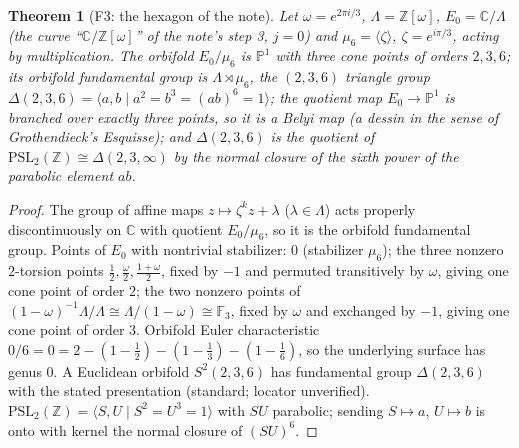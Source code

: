 \documentclass[11pt]{article}
\newtheorem{theorem}{Theorem}\newtheorem{lemma}[theorem]{Lemma}\newtheorem{corollary}[theorem]{Corollary}
\theoremstyle{definition}\newtheorem{definition}[theorem]{Definition}\newtheorem{remark}[theorem]{Remark}
\begin{document}
\begin{theorem}[F3: the hexagon of the note]\label{F3} Let $\omega=e^{2\pi i/3}$, $\Lambda=\mathbb Z[\omega]$, $E_0=\mathbb C/\Lambda$
(the curve ``$\mathbb C/\mathbb Z[\omega]$'' of the note's step 3, $j=0$) and $\mu_6=\langle\zeta\rangle$, $\zeta=e^{i\pi/3}$, acting by
multiplication. The orbifold $E_0/\mu_6$ is $\mathbb P^1$ with three cone points of orders $2,3,6$; its orbifold fundamental
group is $\Lambda\rtimes\mu_6$, the $(2,3,6)$ triangle group $\Delta(2,3,6)=\langle a,b\mid a^2=b^3=(ab)^6=1\rangle$; the
quotient map $E_0\to\mathbb P^1$ is branched over exactly three points, so it is a Belyi map (a dessin in the sense of
Grothendieck's \emph{Esquisse}); and $\Delta(2,3,6)$ is the quotient of $\mathrm{PSL}_2(\mathbb Z)\cong\Delta(2,3,\infty)$ by
the normal closure of the sixth power of the parabolic element $ab$.\end{theorem}
\begin{proof} The group of affine maps $z\mapsto\zeta^kz+\lambda$ ($\lambda\in\Lambda$) acts properly discontinuously on
$\mathbb C$ with quotient $E_0/\mu_6$, so it is the orbifold fundamental group. Points of $E_0$ with nontrivial stabilizer:
$0$ (stabilizer $\mu_6$); the three nonzero $2$-torsion points $\tfrac12,\tfrac\omega2,\tfrac{1+\omega}2$, fixed by $-1$
and permuted transitively by $\omega$, giving one cone point of order $2$; the two nonzero points of
$(1-\omega)^{-1}\Lambda/\Lambda\cong\Lambda/(1-\omega)\cong\mathbb F_3$, fixed by $\omega$ and exchanged by $-1$, giving one
cone point of order $3$. Orbifold Euler characteristic $0/6=0=2-(1-\tfrac12)-(1-\tfrac13)-(1-\tfrac16)$, so the underlying
surface has genus $0$. A Euclidean orbifold $S^2(2,3,6)$ has fundamental group $\Delta(2,3,6)$ with the stated presentation
(standard; locator unverified). $\mathrm{PSL}_2(\mathbb Z)=\langle S,U\mid S^2=U^3=1\rangle$ with $SU$ parabolic; sending
$S\mapsto a$, $U\mapsto b$ is onto with kernel the normal closure of $(SU)^6$.\end{proof}
\end{document}
